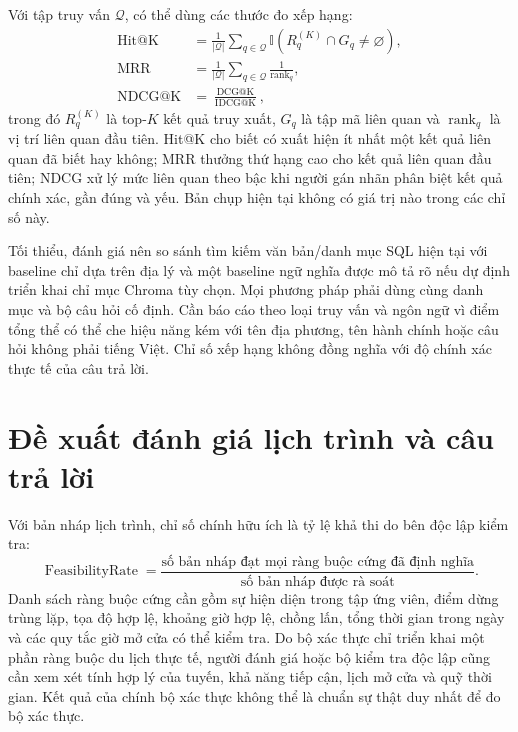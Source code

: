 Với tập truy vấn $\mathcal{Q}$, có thể dùng các thước đo xếp hạng:
\begin{align}
    \operatorname{Hit@K}
    &= \frac{1}{|\mathcal{Q}|}
       \sum_{q\in\mathcal{Q}}
       \mathbb{I}\left(R_q^{(K)}\cap G_q\ne\varnothing\right),\\
    \operatorname{MRR}
    &= \frac{1}{|\mathcal{Q}|}
       \sum_{q\in\mathcal{Q}}\frac{1}{\operatorname{rank}_q},\\
    \operatorname{NDCG@K}
    &= \frac{\operatorname{DCG@K}}{\operatorname{IDCG@K}},
\end{align}
trong đó $R_q^{(K)}$ là top-$K$ kết quả truy xuất, $G_q$ là tập mã liên quan và $\operatorname{rank}_q$ là vị trí liên quan đầu tiên. Hit@K cho biết có xuất hiện ít nhất một kết quả liên quan đã biết hay không; MRR thưởng thứ hạng cao cho kết quả liên quan đầu tiên; NDCG xử lý mức liên quan theo bậc khi người gán nhãn phân biệt kết quả chính xác, gần đúng và yếu. Bản chụp hiện tại không có giá trị nào trong các chỉ số này.

Tối thiểu, đánh giá nên so sánh tìm kiếm văn bản/danh mục SQL hiện tại với baseline chỉ dựa trên địa lý và một baseline ngữ nghĩa được mô tả rõ nếu dự định triển khai chỉ mục Chroma tùy chọn. Mọi phương pháp phải dùng cùng danh mục và bộ câu hỏi cố định. Cần báo cáo theo loại truy vấn và ngôn ngữ vì điểm tổng thể có thể che hiệu năng kém với tên địa phương, tên hành chính hoặc câu hỏi không phải tiếng Việt. Chỉ số xếp hạng không đồng nghĩa với độ chính xác thực tế của câu trả lời.

\section{Đề xuất đánh giá lịch trình và câu trả lời}

Với bản nháp lịch trình, chỉ số chính hữu ích là tỷ lệ khả thi do bên độc lập kiểm tra:
\begin{equation}
    \operatorname{FeasibilityRate}
    = \frac{\text{số bản nháp đạt mọi ràng buộc cứng đã định nghĩa}}
           {\text{số bản nháp được rà soát}}.
\end{equation}
Danh sách ràng buộc cứng cần gồm sự hiện diện trong tập ứng viên, điểm dừng trùng lặp, tọa độ hợp lệ, khoảng giờ hợp lệ, chồng lấn, tổng thời gian trong ngày và các quy tắc giờ mở cửa có thể kiểm tra. Do bộ xác thực chỉ triển khai một phần ràng buộc du lịch thực tế, người đánh giá hoặc bộ kiểm tra độc lập cũng cần xem xét tính hợp lý của tuyến, khả năng tiếp cận, lịch mở cửa và quỹ thời gian. Kết quả  của chính bộ xác thực không thể là chuẩn sự thật duy nhất để đo bộ xác thực.

